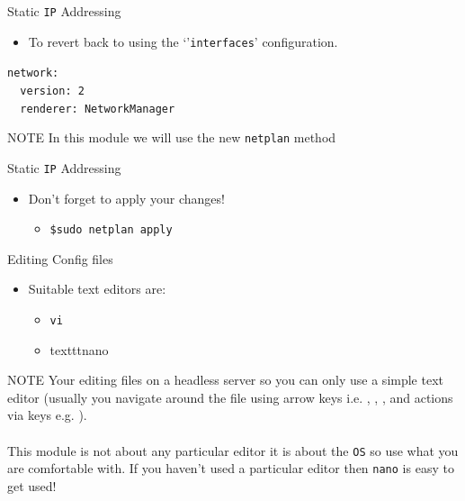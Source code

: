 \documentclass{beamer}
\begin{document}
\begin{frame}{Static \texttt{IP} Addressing}
  \begin{itemize}
    \item To revert back to using the `'\texttt{interfaces}' configuration.
  \end{itemize}
  \begin{center}
    \begin{minipage}{9cm}
      \begin{block}{}
        \texttt{network:\\
        ~~version: 2\\
        ~~renderer: NetworkManager\\}
      \end{block}
    \end{minipage}
  \end{center}
  \begin{block}{NOTE}
    In this module we will use the new \texttt{netplan} method
  \end{block}
\end{frame}

\begin{frame}{Static \texttt{IP} Addressing}
  \begin{itemize}
    \item Don't forget to apply your changes!
    \begin{itemize}
      \item \texttt{\$sudo netplan apply}
    \end{itemize}
  \end{itemize}
\end{frame}

\begin{frame}{Editing Config files}
  \begin{itemize}
    \item Suitable text editors are:
    \begin{itemize}
      \item \texttt{vi}
      \item texttt{nano}
    \end{itemize}
  \end{itemize}
  \begin{block}{NOTE}
    Your editing files on a headless server so you can only use a simple text editor (usually you navigate around the file using arrow keys i.e. \keys{\textuparrow}, \keys{\textdownarrow}, \keys{\textleftarrow}, \keys{\textrightarrow} and actions via  keys e.g. ).\\~\\
    This module is not about any particular editor it is about the \texttt{OS} so use what you are comfortable with. If you haven't used a particular editor then \texttt{nano} is easy to get used!
  \end{block}
\end{frame}
\end{document}
